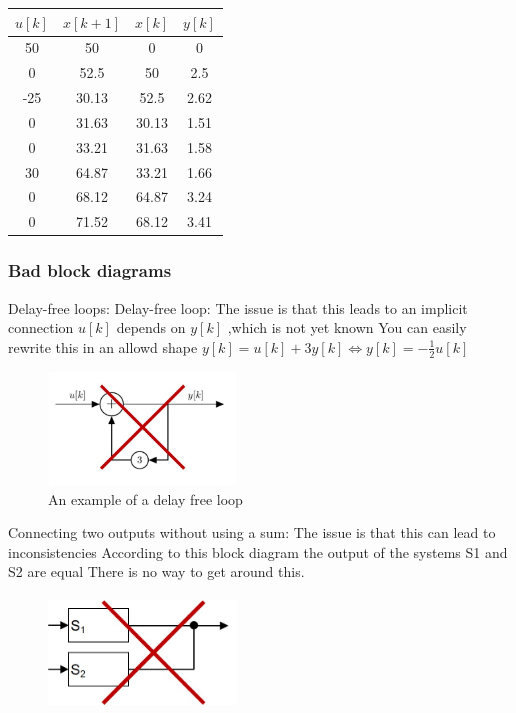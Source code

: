 \begin{frame}
	\begin{tabular}{|c|c|c|c|}
		\hline  $u[k]$& $x[k+1]$  & $x[k]$  & $y[k]$  \\ 
		\hline  50 & 50 & 0  & 0  \\ 
		\hline  0 & 52.5  & 50 & 2.5  \\ 
		\hline  -25 & 30.13 & 52.5 & 2.62  \\ 
		\hline  0 &  31.63 & 30.13  & 1.51  \\ 
		\hline  0 & 33.21  & 31.63 & 1.58 \\ 
		\hline  30 & 64.87 & 33.21  & 1.66 \\ 
		\hline  0 & 68.12 & 64.87 & 3.24  \\ 
		\hline  0 & 71.52 & 68.12 & 3.41 \\
		\hline 
	\end{tabular}
	

\end{frame}
\begin{frame}
	\frametitle{Bad block diagrams}
	
		Delay-free loops:
		Delay-free loop:
		The issue is that this leads to an implicit connection 
		$u[k]$ depends on $y[k]$ ,which is not yet known
		You can easily rewrite this in an allowd shape
		$y[k] = u[k]  + 3 y[k] \Longleftrightarrow y[k] = -\frac{1}{2} u[k]$
		
\begin{figure}
\centering
\includegraphics[width=5cm, height=3cm]{Images/discrete_time_systems_4}
\caption{An example of a delay free loop}
\label{fig:discrete_time_systems_4}
\end{figure}
\end{frame}
\begin{frame}
Connecting two outputs without using a sum: The issue is that this can lead to inconsistencies
According to this block diagram the output of the systems S1 and S2 are equal
There is no way to get around this.

\begin{figure}
\centering
\includegraphics[width=5cm, height=3cm]{Images/discrete_time_systems_5}
\caption{}
\label{fig:discrete_time_systems_5}
\end{figure}
\end{frame}
